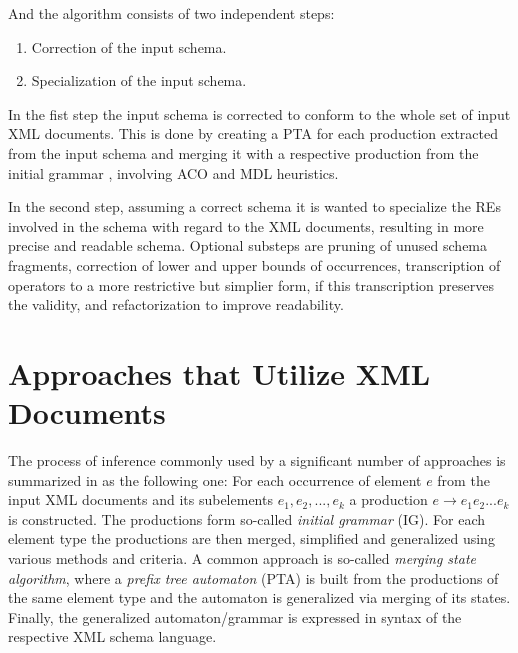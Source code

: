 And the algorithm consists of two independent steps:

\begin{enumerate}
\item Correction of the input schema.
\item Specialization of the input schema.
\end{enumerate}

In the fist step the input schema is corrected to conform to the whole set of input XML documents. This is done by creating a PTA  for each production extracted from the input schema and merging it with a respective production from the initial grammar , involving ACO and MDL heuristics.

In the second step, assuming a correct schema it is wanted to specialize the REs involved in the schema with regard to the XML documents, resulting in more precise and readable schema. Optional substeps are pruning of unused schema fragments, correction of lower and upper bounds of occurrences, transcription of operators to a more restrictive but simplier form, if this transcription preserves the validity, and refactorization to improve readability.

\section{Approaches that Utilize XML Documents}
The process of inference commonly used by a significant number of approaches is summarized in \cite{Mlynkova:2008:AAX:1494650.1495496} as the following one: For each occurrence of element $e$ from the input XML documents and its subelements $e_1, e_2, ..., e_k$ a production $e \rightarrow e_1 e_2 ... e_k$ is constructed. The productions form so-called \emph{initial grammar} (IG). For each element type the productions are then merged, simplified and generalized using various methods and criteria. A common approach is so-called \emph{merging state algorithm}, where a \emph{prefix tree automaton} (PTA) is built from the productions of the same element type and the automaton is generalized via merging of its states. Finally, the generalized automaton/grammar is expressed in syntax of the respective XML schema language.


